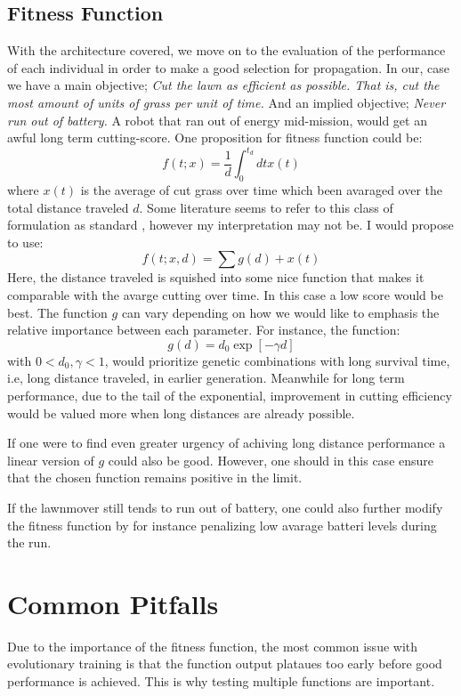 \documentclass{article}
\begin{document}
\subsection{Fitness Function}
With the architecture covered, we move on to the evaluation of the performance
of each individual in order to make a good selection for propagation. In our, 
case we have a main objective; \textit{ Cut the lawn as efficient as possible. 
That is, cut the most amount of units of grass per unit of time.} And an
implied objective; \textit{Never run out of battery.} A robot that ran out of 
energy mid-mission, would get an awful long term cutting-score. One proposition
for fitness function could be:
\begin{equation}
    f(t; x) = \frac{1}{d}\int_0^{t_d} dt x(t)      
\end{equation}
where $x(t)$ is the average of cut grass over time which been avaraged over the
total distance traveled $d$. Some literature seems to refer to this class of
formulation as standard \cite{NELSON2009345}, however my interpretation may not
be. I would propose to use:
\begin{equation}
    f(t; x, d) = \sum g(d) + x(t)
\end{equation}
Here, the distance traveled is squished into some nice function that makes it
comparable with the avarge cutting over time. In this case a low score would
be best. The function $g$ can vary depending on how we would like to emphasis
the relative importance between each parameter. For instance, the function:
\begin{equation}
    g(d) = d_0 \exp[-\gamma d]
\end{equation}
with $0 < d_0, \gamma < 1$, would prioritize genetic combinations with long 
survival time, i.e, long distance traveled, in earlier generation. Meanwhile 
for long term performance, due to the tail of the exponential, 
improvement in cutting efficiency would be valued more when long distances are
already possible.

If one were to find even greater urgency of achiving long distance performance 
a linear version of $g$ could also be good. However, one should in this case
ensure that the chosen function remains positive in the limit.

If the lawnmover still tends to run out of battery, one could also further 
modify the fitness function by for instance penalizing low avarage batteri 
levels during the run.

\section{Common Pitfalls}
Due to the importance of the fitness function, the most common issue with 
evolutionary training is that the function output plataues too early before 
good performance is achieved. 
This is why testing multiple functions are important. 
\end{document}
